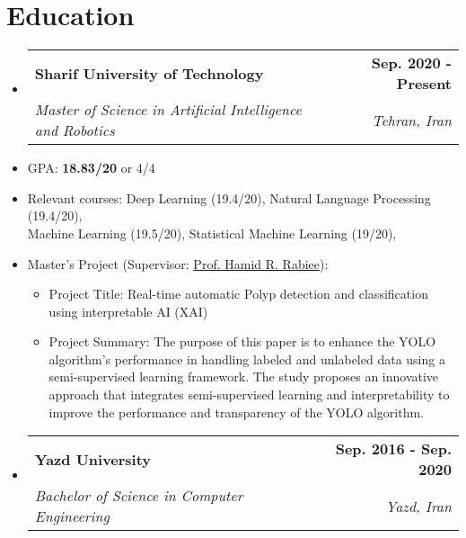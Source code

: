 \documentclass[letterpaper,11pt]{article}
\makeatletter
\newcommand{\resumeSubheading}[4]{
  \vspace{-2pt}\item
    \begin{tabular*}{1.0\textwidth}[t]{l@{\extracolsep{\fill}}r}
      \textbf{#1} & \textbf{\small #2} \\
    \textcolor{sgray} {\textit{\small#3}} & \textcolor{sgray}{ \textit{\small #4} }\\
    \end{tabular*}\vspace{-7pt}
}
\newcommand{\resumeSubHeadingListStart}{\begin{itemize}[leftmargin=0.0in, label={}]}
\newcommand{\resumeSubHeadingListEnd}{\end{itemize}}
\makeatother
\begin{document}
\section{Education}
  \resumeSubHeadingListStart
    \resumeSubheading
      {Sharif University of Technology}{Sep. 2020 - Present}
      {Master of Science in Artificial Intelligence and Robotics}{Tehran, Iran}
  \resumeSubHeadingListEnd
    

\begin{itemize}[itemsep=-3pt, parsep=5pt]
\item  GPA: \textbf{18.83/20} or 4/4

\item Relevant courses:
Deep Learning (19.4/20),
Natural Language Processing (19.4/20), \\
Machine Learning (19.5/20),
Statistical Machine Learning (19/20), 

\item Master's Project (Supervisor:  \hyperref[references]{Prof. Hamid R. Rabiee}):
\vspace*{-0.2cm}
\begin{itemize}[itemsep=-3pt, parsep=5pt]
\item Project Title: Real-time automatic Polyp detection and classification using interpretable AI (XAI)

\item Project Summary: 
The purpose of this paper is to enhance the YOLO algorithm's performance in handling labeled and unlabeled data using a semi-supervised learning framework. The study proposes an innovative approach that integrates semi-supervised learning and interpretability to improve the performance and transparency of the YOLO algorithm.
\end{itemize}
\end{itemize}  


  \resumeSubHeadingListStart
    \resumeSubheading
      {Yazd University}{Sep. 2016 - Sep. 2020}
      {Bachelor of Science in Computer Engineering}{Yazd, Iran}
  \resumeSubHeadingListEnd
  
\end{document}
